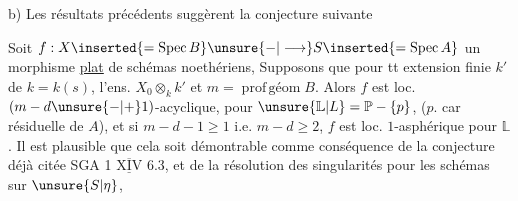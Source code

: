 
b) Les résultats précédents suggèrent la conjecture suivante 

Soit $f:X\inserted{=\operatorname{Spec}B}\unsure{-|\longrightarrow}S\inserted{=\operatorname{Spec}A}$ un morphisme \uline{plat} de schémas noethériens,    Supposons que  pour tt extension finie $k'$ de $k=k(s)$, l'ens.  $X_0\otimes_k k'$   et $m=\operatorname{prof\,géom}B$. Alors $f$ est loc. $(m-d\unsure{-|+}1)$-acyclique,  pour $\unsure{\mathbb{L}|L}=\mathbb{P}-\{p\}$, ($p$. car résiduelle de $A$), et si $m-d-1\geq1$ i.e. $m-d\geq2$, $f$ est loc. $1$-asphérique pour $\mathbb{L}$.  Il est plausible que cela soit démontrable comme conséquence de la conjecture déjà citée SGA 1 $\overline{\underline{\mathrm{XIV}}}$ 6.3, et de la résolution des singularités pour les schémas  sur $\unsure{S|\eta}$,
